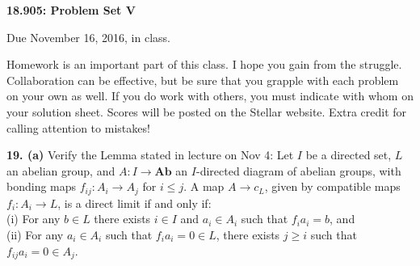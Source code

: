 \documentclass[12pt]{article}
\begin{document}
\thispagestyle{empty}

\def\da#1{\downarrow\rlap{$\vcenter{\hbox{$\scriptstyle#1$}}$}}
\def\ua#1{\uparrow\rlap{$\vcenter{\hbox{$\scriptstyle#1$}}$}}

\def\coker{\mathrm{coker}\,}
\def\im{\mathrm{im}\,}
\def\ker{\mathrm{ker}\,}
\def\NN{\mathbb N}
\def\ZZ{\mathbb Z}
\def\RR{\mathbb R}
\def\QQ{\mathbb Q} 
\def\CC{\mathbb C}
\def\FF{\mathbb F}
\def\Ext{\mathrm{Ext}}
\def\Tor{\mathrm{Tor}}
\def\Hom{\mathrm{Hom}}
\def\Der{\mathrm{Der}}
\def\Map{\mathrm{Map}}
\def\Gp{\mathbf{Gp}}
\def\Mon{\mathbf{Mon}}
\def\mod{\hbox{mod}}
\def\be{\begin{equation}}
\def\ee{\end{equation}}
\def\tensor{\otimes}
\def\iso{\cong}
\def\Ho{\mathrm{Ho}\,}
\def\rin{\mathrm{in}}
\def\Fun{\mathrm{Fun}}
\def\id{\mathrm{id}}
\def\nt{\mathrm{nt}}

\def\la#1{\mathop{\longleftarrow}\limits^{#1}}
\def\ra#1{\mathop{\longrightarrow}\limits^{#1}}


\def\bS{\mathbf{S}}

\def\inj{\mathrm{in}}
\def\pr{\mathrm{pr}}
\def\div{\mathrm{div}}
\def\grad{\mathrm{grad}}
\def\curl{\mathrm{curl}}
\def\Sin{\mathrm{Sin}}

\def\SF{\mathcal{C}^\infty}
\def\VF{\mathcal{VF}^\infty}


\def\TT{\mathbb{T}}
\def\Tensor{\bigotimes}
\def\bDelta{\mathbf{\Delta}}
\def\bSet{\mathbf{Set}}
\def\bAb{\mathbf{Ab}}
\def\bTop{\mathbf{Top}}
\def\bC{\mathbf{C}}
\def\ob{\mathrm{ob}}
\def\bVS{\mathbf{VS}}

\def\cP{\mathcal{P}}
\def\cE{\mathcal{E}}


\begin{center}
{\bf 18.905: Problem Set V}
\end{center}

Due November 16, 2016, in class. 

Homework is an important part of this class. I hope you gain from the
struggle. Collaboration can be effective, but be sure that you
grapple with each problem on your own as well. If you do work with others,
you must indicate with whom on your solution sheet. Scores will be posted
on the Stellar website. Extra credit for calling attention to mistakes!

\bigskip
{\bf 19. (a)} Verify the Lemma stated in lecture on Nov 4:
Let $I$ be a directed set, $L$ an abelian group, and $A:I\to\bAb$ an 
$I$-directed diagram of abelian groups, with bonding maps
$f_{ij}:A_i\to A_j$ for $i\leq j$. A map $A\to c_L$, given by 
compatible maps $f_i:A_i\to L$, is a direct limit if and only if:\\
(i) For any $b\in L$ there exists $i\in I$ and $a_i\in A_i$ such that 
$f_ia_i=b$, and\\
(ii) For any $a_i\in A_i$ such that $f_ia_i=0\in L$, there exists $j\geq i$
such that $f_{ij}a_i=0\in A_j$.
\end{document}
